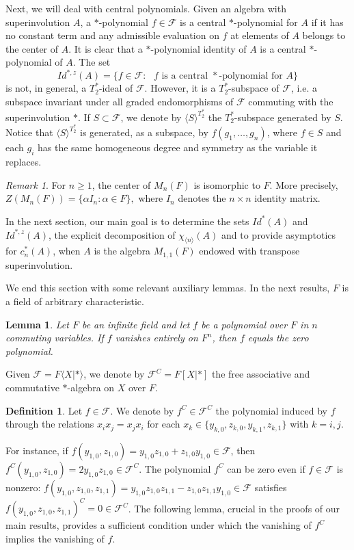 \documentclass[11pt]{amsart}
\newtheorem{lemma}[theorem]{Lemma}
\theoremstyle{definition}
\newtheorem{definition}[theorem]{Definition}
\theoremstyle{remark}
\newtheorem{remark}[theorem]{Remark}
\begin{document}
	Next, we will deal with central polynomials. Given an algebra with superinvolution $A$, a $*$-polynomial $f\in \mathcal{F}$ is a central $*$-polynomial for $A$ if it has no constant term and any admissible evaluation on $f$ at elements of $A$ belongs to the center of $A$. It is clear that a $*$-polynomial identity of $A$ is a central $\ast$-polynomial of $A$. The set $$Id^{*,z}(A)=\{f\in \mathcal{F}:\mbox{ $f$ is a central $*$-polynomial for $A$}\}$$ is not, in general, a $T_2^*$-ideal of $\mathcal{F}$. However, it is a $T_2^*$-subspace of $\mathcal{F}$, i.e. a subspace invariant under all graded endomorphisms of $\mathcal{F}$ commuting with the superinvolution $*$. If $S\subset \mathcal{F}$, we denote by $\langle S\rangle^{T_2^*}$ the $T_2^*$-subspace generated by $S$. Notice that $\langle S\rangle^{T_2^*}$ is generated, as a subspace, by $f(g_1,\ldots,g_n)$, where $f\in S$ and each $g_i$ has the same homogeneous degree and symmetry
as the variable it replaces.

     \begin{remark}\label{rem:center}
         For $n\geq 1$, the center of $M_n(F)$ is isomorphic to $F$. More precisely, $Z(M_n(F))=\{\alpha I_n:\alpha \in F\},$ where $I_n$ denotes the $n\times n$ identity matrix.
     \end{remark}
     
	 
	 In the next section, our main goal is to determine the sets $Id^*(A)$ and $Id^{*,z}(A)$, the explicit decomposition of $\chi_{\langle n\rangle}(A)$ and to provide asymptotics for $c_n^{*}(A)$, when $A$ is the algebra $M_{1,1}(F)$ endowed with transpose superinvolution.
	 
	We end this section with some relevant auxiliary lemmas. In the next results, $F$ is a field of arbitrary characteristic.
	
		\begin{lemma}\label{lem:vanish}
		Let $F$ be an infinite field and let $f$ be a polynomial over $F$ in $n$ commuting variables. If $f$ vanishes entirely on $F^n$, then $f$ equals the zero polynomial.
	\end{lemma}
	
	Given $\mathcal{F}=F \langle X|* \rangle$, we denote by $\mathcal{F}^C=F[X|*]$ the free associative and commutative $*$-algebra on $X$ over $F$.
	
	\begin{definition}
		
		Let $f\in \mathcal{F}$. We denote by $f^C\in \mathcal{F}^C$ the polynomial induced by $f$ through the relations $x_ix_j=x_jx_i$ for each $x_k\in\{y_{k,0},z_{k,0},y_{k,1},z_{k,1}\}$ with  $k=i,j$.
	\end{definition}
	For instance, if $f(y_{1,0}, z_{1,0})=y_{1,0}z_{1,0}+z_{1,0}y_{1,0}\in \mathcal{F}$, then $f^C(y_{1,0}, z_{1,0})=2y_{1,0}z_{1,0}\in \mathcal{F}^C$. The polynomial $f^C$ can be zero even if $f\in \mathcal F$ is nonzero: $f(y_{1, 0}, z_{1, 0}, z_{1, 1})=y_{1,0}z_{1,0}z_{1, 1}-z_{1,0}z_{1, 1}y_{1,0}\in \mathcal F$ satisfies $f(y_{1, 0}, z_{1, 0}, z_{1, 1})^C=0\in \mathcal F^C$. The following lemma, crucial in the proofs of our main results, provides a sufficient condition under which the vanishing of $f^C$ implies the vanishing of $f$.
	
\end{document}
